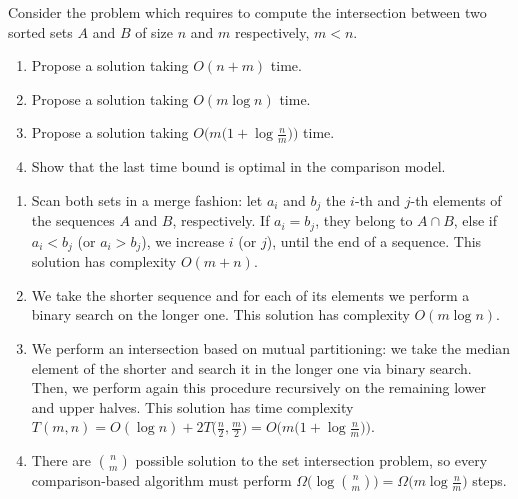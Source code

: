 \exercise

Consider the problem which requires to compute the intersection between two
sorted sets $A$ and $B$ of size $n$ and $m$ respectively, $m < n$.
%
\begin{enumerate}
  \item Propose a solution taking $O(n + m)$ time.
  \item Propose a solution taking $O(m \log n)$ time.
  \item Propose a solution taking $O\big(m \big(1 + \log \frac{n}{m}\big)\big)$ time.
  \item Show that the last time bound is optimal in the comparison model.
\end{enumerate}

\solution

\begin{enumerate}

  \item Scan both sets in a merge fashion: let $a_i$ and $b_j$ the $i$-th and
  $j$-th elements of the sequences $A$ and $B$, respectively. If $a_i = b_j$,
  they belong to $A \cap B$, else if $a_i < b_j$ (or $a_i > b_j$), we increase
  $i$ (or $j$), until the end of a sequence. This solution has complexity $O(m +
  n)$.

  \item We take the shorter sequence and for each of its elements we perform a
  binary search on the longer one. This solution has complexity $O(m\log n)$.

  \item We perform an intersection based on mutual partitioning: we take the
  median element of the shorter and search it in the longer one via binary
  search. Then, we perform again this procedure recursively on the remaining
  lower and upper halves. This solution has time complexity $T(m,n) = O(\log n)
  + 2T\big(\frac{n}{2}, \frac{m}{2}\big) = O\big(m \big(1 + \log
  \frac{n}{m}\big)\big)$.

  \item There are $n \choose m$ possible solution to the set intersection
  problem, so every comparison-based algorithm must perform $\Omega\big(\log {n
  \choose m}\big) = \Omega\big(m\log \frac{n}{m}\big)$ steps.

\end{enumerate}
